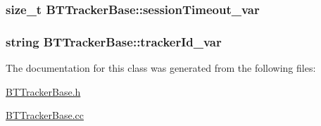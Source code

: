 \subsubsection[{session\+Timeout\+\_\+var}]{\setlength{\rightskip}{0pt plus 5cm}size\+\_\+t B\+T\+Tracker\+Base\+::session\+Timeout\+\_\+var\hspace{0.3cm}{\ttfamily [protected]}}\label{classBTTrackerBase_a1ced4f437ab0e81e1904c17c4e7b3f02}
\hypertarget{classBTTrackerBase_adf43f3c801c6904772843b85bc6d2c13}{}
\subsubsection[{tracker\+Id\+\_\+var}]{\setlength{\rightskip}{0pt plus 5cm}string B\+T\+Tracker\+Base\+::tracker\+Id\+\_\+var\hspace{0.3cm}{\ttfamily [protected]}}\label{classBTTrackerBase_adf43f3c801c6904772843b85bc6d2c13}


The documentation for this class was generated from the following files\+:\begin{DoxyCompactItemize}
\item 
\hyperlink{BTTrackerBase_8h}{B\+T\+Tracker\+Base.\+h}\item 
\hyperlink{BTTrackerBase_8cc}{B\+T\+Tracker\+Base.\+cc}\end{DoxyCompactItemize}
